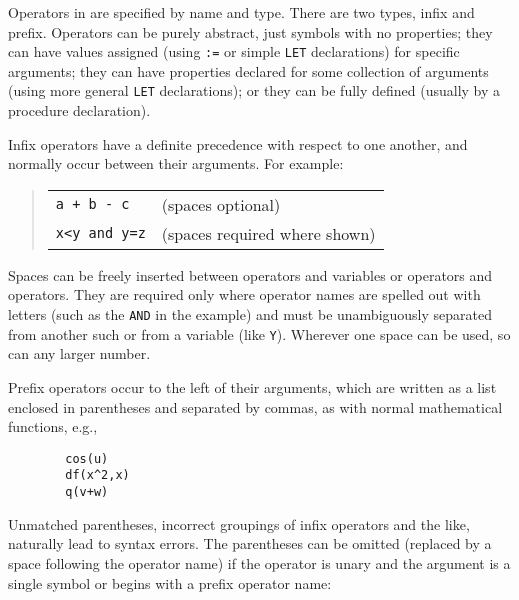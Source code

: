 Operators in {\REDUCE} are specified by name and type.
There are two types, infix and prefix.
  Operators can be purely abstract, just symbols
with no properties; they can have values assigned (using \texttt{:=} or
simple \texttt{LET} declarations) for specific arguments; they can have
properties declared for some collection of arguments (using more general
\texttt{LET} declarations); or they can be fully defined (usually by a
procedure declaration).

Infix operators have a definite precedence with
respect to one another, and normally occur between their arguments.
For example:
\begin{quote}
\begin{tabular}{p{4cm}l}
\texttt{a + b - c} & (spaces optional) \\
\texttt{x<y and y=z} & (spaces required where shown)
\end{tabular}
\end{quote}
Spaces can be freely inserted between operators and variables or operators
and operators. They are required only where operator names are spelled out
with letters (such as the \texttt{AND} in the example) and must be unambiguously
separated from another such or from a variable (like \texttt{Y}). Wherever one
space can be used, so can any larger number.

Prefix operators occur to the left of their arguments, which are written as
a list enclosed in parentheses and separated by commas, as with normal
mathematical functions, e.g.,
\begin{verbatim}
        cos(u)
        df(x^2,x)
        q(v+w)
\end{verbatim}
Unmatched parentheses, incorrect groupings of infix operators
 and the like, naturally lead to syntax errors.  The
parentheses can be omitted (replaced by a space following the
operator name) if the operator is unary and the argument
is a single symbol or begins with a prefix operator name:

